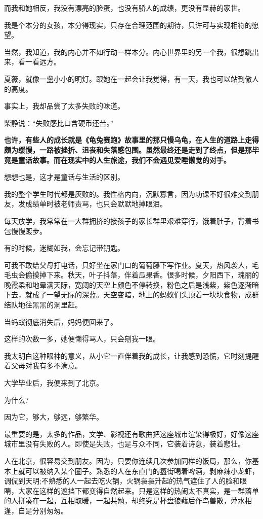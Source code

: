 \documentclass[UTF8,a4paper,8pt]{ctexart}
\begin{document}
 而我和她相反，我没有漂亮的脸蛋，也没有骄人的成绩，更没有显赫的家世。
 
 我是个本分的女孩，本分得现实，只存在合理范围的期待，只许可与实现相符的愿望。
 
 当然，我知道，我的内心并不如行动一样本分。内心世界里的另一个我，很想跳出来，看一看远方。
 
 夏薇，就像一盏小小的明灯。跟她在一起会让我觉得，有一天，我也可以站到傲人的高度。
 
 事实上，我却品尝了太多失败的味道。
 
 柴静说：“失败感比口含硬币还苦。”
 
 \textbf{也许，有些人的成长就是《龟兔赛跑》故事里的那只慢乌龟，在人生的道路上走得颇为缓慢，一路被挫折、沮丧和失落感包围。虽然最终还是走到了终点，但是那毕竟是童话故事。而在现实中的人生旅途，我们不会遇见爱睡懒觉的对手。}
 
 想想也是，这才是童话与生活的区别。
 
 我的整个学生时代都是灰败的。我性格内向，沉默寡言，因为功课不好很难交到朋友，发成绩单时被老师责骂，也只会默默地掉眼泪。
 
 每天放学，我常常在一大群拥挤的接孩子的家长群里艰难穿行，饿着肚子，背着书包慢慢踱步。
 
 有的时候，迷糊如我，会忘记带钥匙。
 
 可我不敢给父母打电话，只好坐在家门口的葡萄藤下写作业。夏天，热风袭人，毛毛虫会偷摸掉下来。秋天，叶子抖落，伴着瓜果香。很多时候，夕阳西下，瑰丽的晚霞柔和地晕满天际，宽阔的天空上颜色不停转换，粉色之后是浅紫，紫色逐渐暗下去，就成了一望无际的深蓝。天空变暗，地上的蚂蚁们头顶着一块块食物，成群结队地往黑黑的洞里赶。
 
 当蚂蚁彻底消失后，妈妈便回来了。
 
 这样的次数一多，她便懒得骂人，只会剜我一眼。
 
 我太明白这种眼神的意义，从小它一直伴着我的成长，让我感到恐慌，它时刻提醒着父母对我有多不满意。
 
 大学毕业后，我便来到了北京。
 
 为什么?
 
 因为它，够大，够远，够繁华。
 
 最重要的是，太多的作品，文学、影视还有歌曲把这座城市渲染得极好，好像这座城市里没有失败的人。即使是失败，也是与众不同，它装着诗意，装着悲壮。
 
 人在北京，很容易交到朋友。因为，只要你连续几次参加同样的饭局，那么，你基本上就可以被纳入某个圈子。熟悉的人在东直门的簋街喝着啤酒，剥麻辣小龙虾，调侃到天明;不熟悉的人一起去吃火锅，火锅袅袅升起的热气遮住了人的脸和眼睛，大家在这样的遮挡下都变得自然起来。只是这样的热闹太不真实，是一群落单的人拼凑在一起，互相取暖，一起共勉，却终究是杯盘狼藉后作鸟兽散，萍水相逢，自是分别匆匆。
 
\end{document}
